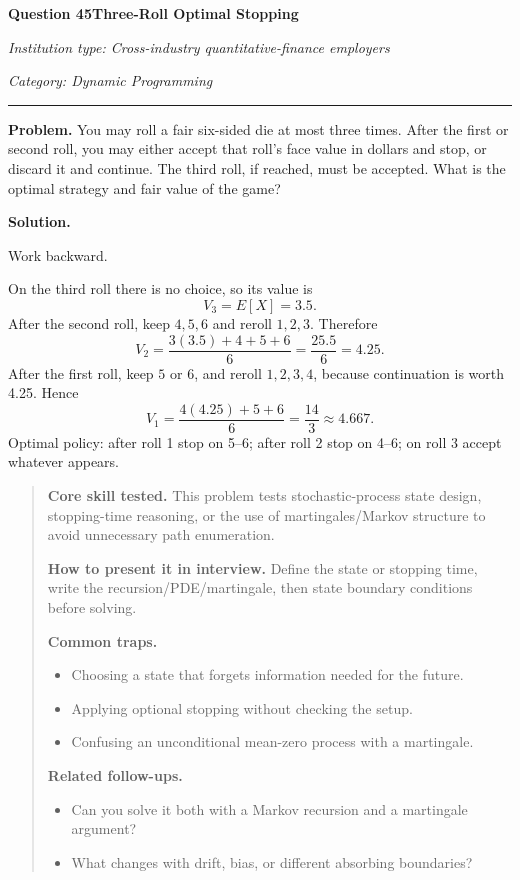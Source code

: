 \documentclass[11pt,letterpaper,openany]{book}
\newenvironment{EditorialNote}
  {\begin{quote}\small\setlength{\parskip}{0.25em}}
  {\end{quote}}
\newcommand{\QuestionSpacer}{\vspace{0.4em}}
\newcommand{\FoundationQuestionHeader}[3]{%
  \vspace{1.0em}%
  {\large\bfseries #1\enspace #2\par}%
  {\small\itshape Institution type: Cross-industry quantitative-finance employers\par}%
  {\small\itshape Category: #3\par}%
  \vspace{0.25em}\hrule\vspace{0.45em}%
}
\begin{document}
\FoundationQuestionHeader{Question 45}{Three-Roll Optimal Stopping}{Dynamic Programming}

\textbf{Problem.} You may roll a fair six-sided die at most three times. After the first or second roll, you may either accept that roll's face value in dollars and stop, or discard it and continue. The third roll, if reached, must be accepted. What is the optimal strategy and fair value of the game?


\textbf{Solution.}

Work backward.

On the third roll there is no choice, so its value is
\[
V_3=E[X]=3.5.
\]
After the second roll, keep \(4,5,6\) and reroll \(1,2,3\). Therefore
\[
V_2=\frac{3(3.5)+4+5+6}{6}=\frac{25.5}{6}=4.25.
\]
After the first roll, keep \(5\) or \(6\), and reroll \(1,2,3,4\), because continuation is worth 4.25. Hence
\[
V_1=\frac{4(4.25)+5+6}{6}=\boxed{\frac{14}{3}}\approx4.667.
\]
Optimal policy: after roll 1 stop on 5--6; after roll 2 stop on 4--6; on roll 3 accept whatever appears.


\begin{EditorialNote}


\textbf{Core skill tested.} This problem tests stochastic-process state design, stopping-time reasoning, or the use of martingales/Markov structure to avoid unnecessary path enumeration.


\textbf{How to present it in interview.} Define the state or stopping time, write the recursion/PDE/martingale, then state boundary conditions before solving.


\textbf{Common traps.}
\begin{itemize}
\item Choosing a state that forgets information needed for the future.
\item Applying optional stopping without checking the setup.
\item Confusing an unconditional mean-zero process with a martingale.
\end{itemize}


\textbf{Related follow-ups.}
\begin{itemize}
\item Can you solve it both with a Markov recursion and a martingale argument?
\item What changes with drift, bias, or different absorbing boundaries?
\end{itemize}


\end{EditorialNote}
\QuestionSpacer
\end{document}
